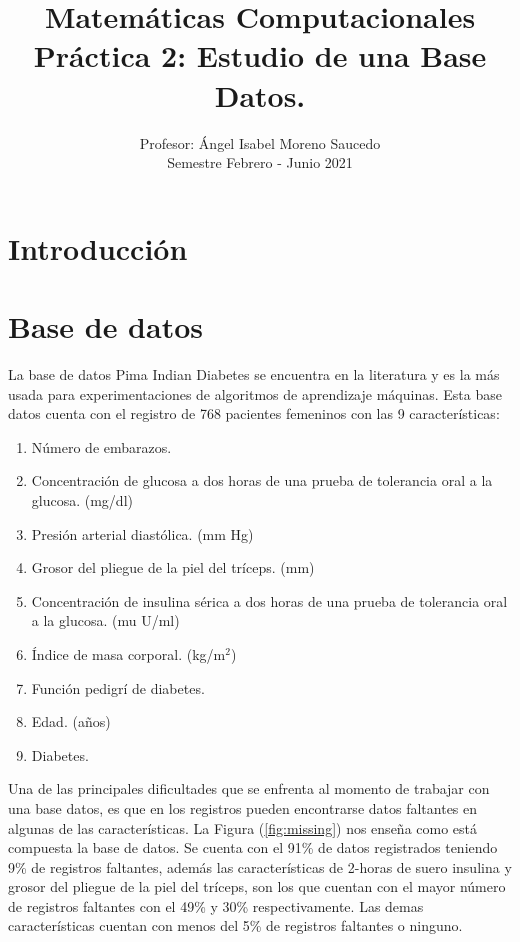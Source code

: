 

\title{Matemáticas Computacionales \\ Práctica 2: Estudio de una Base Datos.}
\author{Profesor: Ángel Isabel Moreno Saucedo \\ Semestre Febrero - Junio 2021}
\date{}



\maketitle

\section{Introducci\'{o}n} \label{sec:intro}



\section{Base de datos} \label{sec:montecarlo}

La base de datos Pima Indian Diabetes se encuentra en la literatura y es la m\'as usada para experimentaciones de algoritmos de aprendizaje m\'aquinas. Esta base datos cuenta con el registro de 768 pacientes femeninos con las 9 características:
\begin{enumerate}
	\item N\'umero de embarazos.
	\item Concentración de glucosa a dos horas de una prueba de tolerancia oral a la glucosa. (mg/dl)
	\item Presión arterial diastólica. (mm Hg)
	\item Grosor del pliegue de la piel del tríceps. (mm)
	\item Concentración  de insulina sérica a dos horas de una prueba de tolerancia oral a la glucosa. (mu U/ml)
	\item \'Indice de masa corporal. (kg/m$^2$)
	\item Funci\'on pedigr\'i de diabetes.
	\item Edad. (años)
	\item Diabetes.
\end{enumerate}

Una de las principales dificultades que se enfrenta al momento de trabajar con una base datos, es que en los registros pueden encontrarse datos faltantes en algunas de las caracter\'isticas. La Figura (\ref{fig:missing}) nos enseña como est\'a compuesta la base de datos. Se cuenta con el 91\% de datos registrados teniendo 9\% de registros faltantes, adem\'as las caracter\'isticas de 2-horas de suero insulina y grosor del pliegue de la piel del tr\'iceps, son los que cuentan con el mayor n\'umero de registros faltantes con el 49\% y 30\% respectivamente. Las demas caracter\'isticas cuentan con menos del 5\% de registros faltantes o ninguno.

